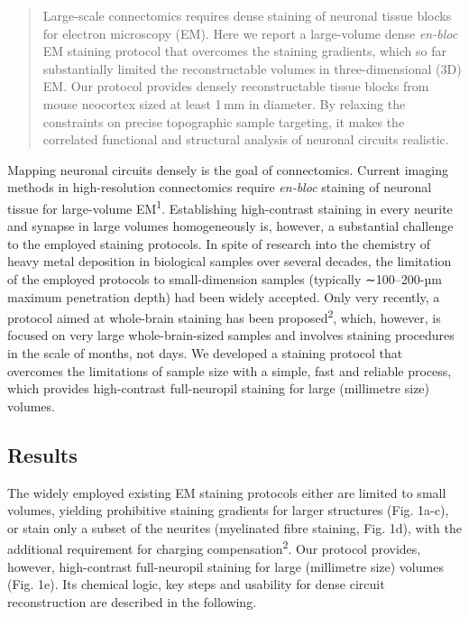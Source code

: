 \documentclass{article}
\begin{document}
\begin{quote}
\noindent Large-scale connectomics requires dense staining of neuronal tissue blocks for electron microscopy (EM). Here we report a large-volume dense \emph{en-bloc} EM staining protocol that overcomes the staining gradients, which so far substantially limited the reconstructable volumes in three-dimensional (3D) EM. Our protocol provides densely reconstructable tissue blocks from mouse neocortex sized at least 1\,mm in diameter. By relaxing the constraints on precise topographic sample targeting, it makes the correlated functional and structural analysis of neuronal circuits realistic.
\end{quote}

\noindent Mapping neuronal circuits densely is the goal of connectomics. Current imaging methods in high-resolution connectomics require \emph{en-bloc} staining of neuronal tissue for large-volume EM\textsuperscript{1}. Establishing high-contrast staining in every neurite and synapse in large volumes homogeneously is, however, a substantial challenge to the employed staining protocols. In spite of research into the chemistry of heavy metal deposition in biological samples over several decades, the limitation of the employed protocols to small-dimension samples (typically ∼100–200-µm maximum penetration depth) had been widely accepted. Only very recently, a protocol aimed at whole-brain staining has been proposed\textsuperscript{2}, which, however, is focused on very large whole-brain-sized samples and involves staining procedures in the scale of months, not days. We developed a staining protocol that overcomes the limitations of sample size with a simple, fast and reliable process, which provides high-contrast full-neuropil staining for large (millimetre size) volumes.

\subsection*{Results}
The widely employed existing EM staining protocols either are limited to small volumes, yielding prohibitive staining gradients for larger structures (Fig. 1a-c), or stain only a subset of the neurites (myelinated fibre staining, Fig. 1d), with the additional requirement for charging compensation\textsuperscript{2}. Our protocol provides, however, high-contrast full-neuropil staining for large (millimetre size) volumes (Fig. 1e). Its chemical logic, key steps and usability for dense circuit reconstruction are described in the following.
\end{document}
